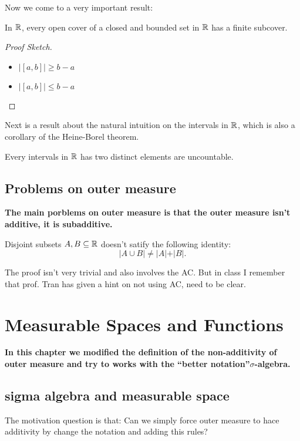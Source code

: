 \documentclass[11pt]{article}
\begin{document}
Now we come to a very important result:
\begin{theorem}
In \(\mathbb{R}\), every open cover of a closed and bounded set in \(\mathbb{R}\) has a finite subcover.
\end{theorem}

\begin{proof}[Proof Sketch]
\leavevmode
\begin{itemize}
\item \(\vert [a,b] \vert \ge b - a\)
\item \(\vert [a,b] \vert \le b - a\)
\end{itemize}
\end{proof}

Next is a result about the natural intuition on the intervals in \(\mathbb{R}\), which is also a corollary of the Heine-Borel theorem.

\begin{proposition}
Every intervals in \(\mathbb{R}\) has two distinct elements are uncountable.
\end{proposition}
\subsection{Problems on outer measure}
\label{sec:org9248923}
\textbf{The main porblems on outer measure is that the outer measure isn't additive, it is subadditive.}

\begin{proposition}
Disjoint subsets \(A,B\subseteq \mathbb{R}\) doesn't satify the following identity:
\[
\vert A \cup B \vert \neq \vert A \vert + \vert B \vert.
\]
\end{proposition}

The proof isn't very trivial and also involves the AC. But in class I remember that prof. Tran has given a hint on not using AC, need to be clear.
\section{Measurable Spaces and Functions}
\label{sec:orgd41ff58}
\textbf{In this chapter we modified the definition of the non-additivity of outer measure and try to works with the ``better notation''\(\sigma\)-algebra.}
\subsection{sigma algebra and measurable space}
\label{sec:orgebf4dee}
The motivation question is that: Can we simply force outer measure to hace additivity by change the notation and adding this rules?
\end{document}
